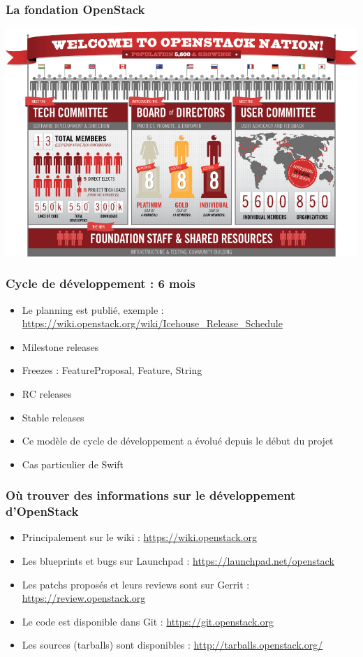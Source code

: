   \begin{frame}
    \frametitle{La fondation OpenStack}
      \includegraphics[width=\textwidth]{images/foundation.png}
  \end{frame}

  \begin{frame}
    \frametitle{Cycle de développement : 6 mois}
    \begin{itemize}
      \item Le planning est publié, exemple : \url{https://wiki.openstack.org/wiki/Icehouse_Release_Schedule}
      \item Milestone releases
      \item Freezes : FeatureProposal, Feature, String
      \item RC releases
      \item Stable releases
      \item Ce modèle de cycle de développement a évolué depuis le début du projet
      \item Cas particulier de Swift
    \end{itemize}
  \end{frame}

  \begin{frame}
    \frametitle{Où trouver des informations sur le développement d'OpenStack}
    \begin{itemize}
      \item Principalement sur le wiki : \url{https://wiki.openstack.org}
      \item Les blueprints et bugs sur Launchpad : \url{https://launchpad.net/openstack}
      \item Les patchs proposés et leurs reviews sont sur Gerrit : \url{https://review.openstack.org}
      \item Le code est disponible dans Git : \url{https://git.openstack.org}
      \item Les sources (tarballs) sont disponibles : \url{http://tarballs.openstack.org/}
    \end{itemize}
  \end{frame}

